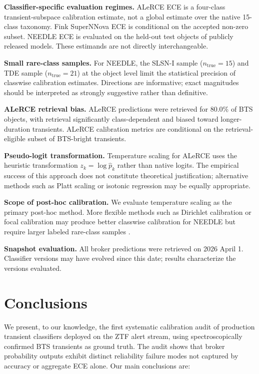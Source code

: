 \documentclass[twocolumn]{aastex631}
\begin{document}
\textbf{Classifier-specific evaluation regimes.} ALeRCE ECE is a
four-class transient-subspace calibration estimate, not a global
estimate over the native 15-class taxonomy. Fink SuperNNova ECE
is conditional on the accepted non-zero subset. NEEDLE ECE is
evaluated on the held-out test objects of publicly released models.
These estimands are not directly interchangeable.

\textbf{Small rare-class samples.} For NEEDLE, the SLSN-I sample
($n_\mathrm{true} = 15$) and TDE sample ($n_\mathrm{true} = 21$)
at the object level limit the statistical precision of classwise
calibration estimates. Directions are informative; exact magnitudes
should be interpreted as strongly suggestive rather than definitive.

\textbf{ALeRCE retrieval bias.} ALeRCE predictions were retrieved
for 80.0\% of BTS objects, with retrieval significantly
class-dependent and biased toward longer-duration transients.
ALeRCE calibration metrics are conditional on the
retrieval-eligible subset of BTS-bright transients.

\textbf{Pseudo-logit transformation.} Temperature scaling for
ALeRCE uses the heuristic transformation $z_k = \log \hat{p}_k$
rather than native logits. The empirical success of this approach
does not constitute theoretical justification; alternative methods
such as Platt scaling or isotonic regression may be equally
appropriate.

\textbf{Scope of post-hoc calibration.} We evaluate temperature
scaling as the primary post-hoc method. More flexible methods such
as Dirichlet calibration \citep{kull2019} or focal calibration
\citep{mukhoti2020} may produce better classwise calibration for
NEEDLE but require larger labeled rare-class samples
\citep{vaicenavicius2019}.

\textbf{Snapshot evaluation.} All broker predictions were
retrieved on 2026 April 1. Classifier versions may have evolved
since this date; results characterize the versions evaluated.


\section{Conclusions} \label{sec:conclusions}

We present, to our knowledge, the first systematic calibration
audit of production transient classifiers deployed on the ZTF
alert stream, using spectroscopically confirmed BTS transients
as ground truth. The audit shows that broker probability outputs
exhibit distinct reliability failure modes not captured by
accuracy or aggregate ECE alone. Our main conclusions are:
\end{document}
